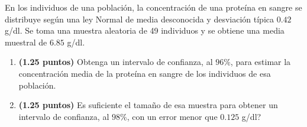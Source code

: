 
En los individuos de una población, la concentración de una proteína en sangre se distribuye según una ley Normal de media desconocida y desviación típica $0.42$ g/dl. Se toma una muestra aleatoria de 49 individuos y se obtiene una media muestral de $6.85$ g/dl.
\begin{enumerate}[label=\alph*)]
\item \textbf{(1.25 puntos)} Obtenga un intervalo de confianza, al $96\%$, para estimar la concentración media de la proteína en sangre de los individuos de esa población.
\item \textbf{(1.25 puntos)} \textquestiondown{}Es suficiente el tamaño de esa muestra para obtener un intervalo de confianza, al $98\%$, con un error menor que $0.125$ g/dl?
\end{enumerate}

